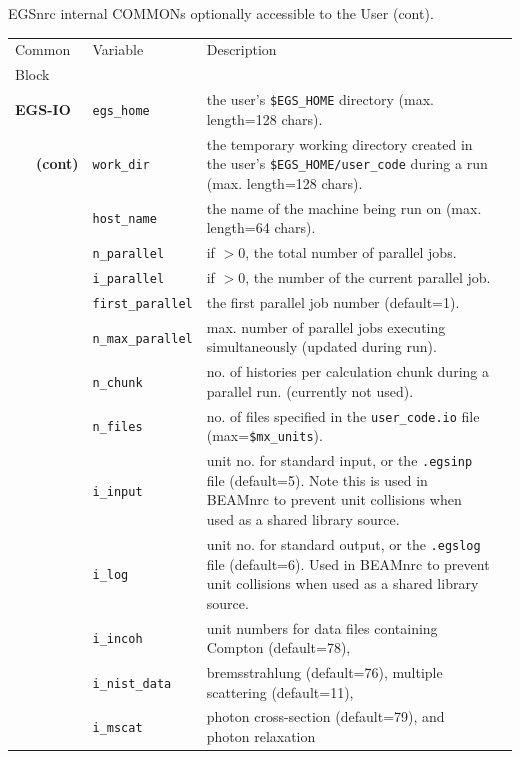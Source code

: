 \begin{table}[htb]


    \begin{center}
    EGSnrc internal COMMONs optionally accessible to the User (cont).
    \begin{tabular}{ l  l   p{105mm}l  |}
    \hline
    Common & Variable & Description \\
    Block &&\\
    \hline
\hline
{\bfseries EGS-IO} & {\tt egs\_home} & the user's {\tt \$EGS\_HOME} directory (max. length=128 chars).\\
\mbox{~~~}{\bfseries (cont)}& {\tt work\_dir} & the temporary working directory created in the user's
{\tt \$EGS\_HOME/user\_code} during a run (max. length=128 chars).\\
& {\tt host\_name} & the name of the machine being run on (max. length=64 chars).\\
& {\tt n\_parallel} & if $>$0, the total number of parallel jobs.\\
& {\tt i\_parallel} & if $>$0, the number of the current parallel job.\\
& {\tt first\_parallel} & the first parallel job number (default=1).\\
& {\tt n\_max\_parallel} & max. number of parallel jobs executing simultaneously
(updated during run).\\
& {\tt n\_chunk} & no. of histories per calculation chunk during a parallel run.
(currently not used).\\
& {\tt n\_files} & no. of files specified in the {\tt user\_code.io} file
(max={\tt \$mx\_units}).\\
& {\tt i\_input} & unit no. for standard input, or the {\tt .egsinp} file (default=5).
Note this is used in BEAMnrc to prevent unit collisions when used as
a shared library source.\\
& {\tt i\_log} & unit no. for standard output, or the {\tt .egslog} file (default=6).
Used in BEAMnrc to prevent unit collisions when used as a
shared library source.\\
& {\tt i\_incoh} & unit numbers for data files containing Compton (default=78),\\
& {\tt i\_nist\_data} & bremsstrahlung (default=76), multiple scattering (default=11),\\
& {\tt i\_mscat} & photon cross-section (default=79), and photon relaxation\\

\end{tabular}
\end{center}
\end{table}
